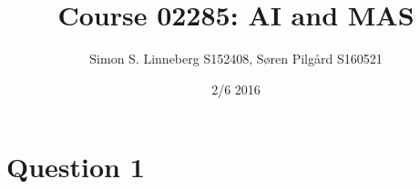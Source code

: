 \documentclass{article}
\title{Course 02285: AI and MAS}
\author{Simon S. Linneberg S152408, Søren Pilgård S160521}
\date{2/6 2016}
\begin{document}
\maketitle

\section{Question 1}
\end{document}
